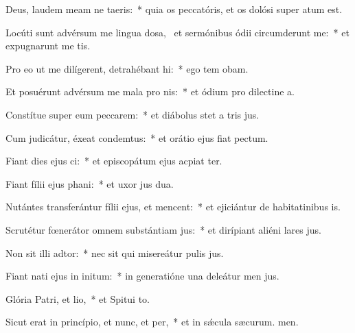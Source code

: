 \item Deus, laudem meam ne taeris:~* quia os peccatóris, et os dolósi super  atum est.
\item Locúti sunt advérsum me lingua dosa,~\pscross{} et sermónibus ódii circumderunt me:~* et expugnarunt me tis.
\item Pro eo ut me dilígerent, detrahébant hi:~* ego tem obam.
\item Et posuérunt advérsum me mala pro nis:~* et ódium pro dilectine a.
\item Constítue super eum peccarem:~* et diábolus stet a tris jus.
\item Cum judicátur, éxeat condemtus:~* et orátio ejus fiat  pectum.
\item Fiant dies ejus ci:~* et episcopátum ejus acpiat ter.
\item Fiant fílii ejus phani:~* et uxor jus dua.
\item Nutántes transferántur fílii ejus, et mencent:~* et ejiciántur de habitatinibus is.
\item Scrutétur fœnerátor omnem substántiam jus:~* et dirípiant aliéni lares jus.
\item Non sit illi adtor:~* nec sit qui misereátur pulis jus.
\item Fiant nati ejus in initum:~* in generatióne una deleátur men jus.
\item Glória Patri, et lio,~* et Spitui to.
\item Sicut erat in princípio, et nunc, et per,~* et in sǽcula sæcurum. men.
